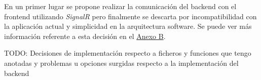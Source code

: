 En un primer lugar se propone realizar la comunicación del backend con el frontend utilizando \textit{SignalR} \cite{signalr} pero finalmente se descarta por incompatibilidad con la aplicación actual y simplicidad en la arquitectura software. Se puede ver más información referente a esta decisión en el \hyperref[anexo-b]{Anexo B}. \newline

TODO: Decisiones de implementación respecto a ficheros y funciones que tengo anotadas y problemas u opciones surgidas respecto a la implementación del backend



